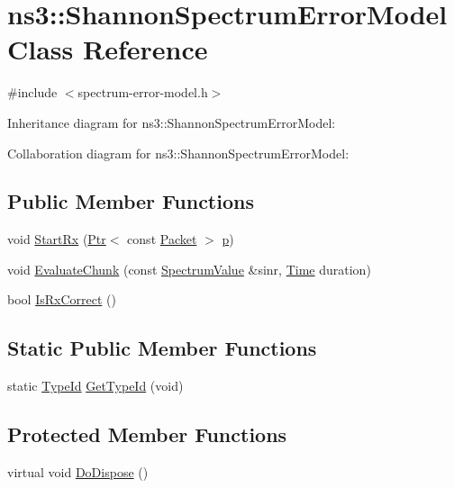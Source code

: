 \hypertarget{classns3_1_1ShannonSpectrumErrorModel}{}\section{ns3\+:\+:Shannon\+Spectrum\+Error\+Model Class Reference}
\label{classns3_1_1ShannonSpectrumErrorModel}


{\ttfamily \#include $<$spectrum-\/error-\/model.\+h$>$}



Inheritance diagram for ns3\+:\+:Shannon\+Spectrum\+Error\+Model\+:


Collaboration diagram for ns3\+:\+:Shannon\+Spectrum\+Error\+Model\+:
\subsection*{Public Member Functions}
\begin{DoxyCompactItemize}
\item 
void \hyperlink{classns3_1_1ShannonSpectrumErrorModel_a5c54736ef0634549ef07ac050736f81f}{Start\+Rx} (\hyperlink{classns3_1_1Ptr}{Ptr}$<$ const \hyperlink{classns3_1_1Packet}{Packet} $>$ \hyperlink{lte__link__budget__x2__handover__measures_8m_ac9de518908a968428863f829398a4e62}{p})
\item 
void \hyperlink{classns3_1_1ShannonSpectrumErrorModel_aef33d9188f5a6b43f908bf72401fe549}{Evaluate\+Chunk} (const \hyperlink{classns3_1_1SpectrumValue}{Spectrum\+Value} \&sinr, \hyperlink{classns3_1_1Time}{Time} duration)
\item 
bool \hyperlink{classns3_1_1ShannonSpectrumErrorModel_ad609e2ec5ba586332acd810c2d86fd2f}{Is\+Rx\+Correct} ()
\end{DoxyCompactItemize}
\subsection*{Static Public Member Functions}
\begin{DoxyCompactItemize}
\item 
static \hyperlink{classns3_1_1TypeId}{Type\+Id} \hyperlink{classns3_1_1ShannonSpectrumErrorModel_aaa594b0d5aafb93d9af86f6f0cf60875}{Get\+Type\+Id} (void)
\end{DoxyCompactItemize}
\subsection*{Protected Member Functions}
\begin{DoxyCompactItemize}
\item 
virtual void \hyperlink{classns3_1_1ShannonSpectrumErrorModel_a9c30a519b88ca97ec90f5214cbe51ddd}{Do\+Dispose} ()
\end{DoxyCompactItemize}
